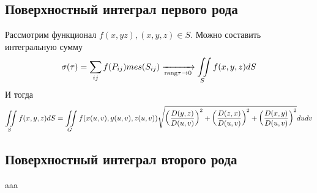 \subsection{Поверхностный интеграл первого рода}

Рассмотрим функционал $f(x, y z), (x, y, z) \in S$.
Можно составить интегральную сумму 
\begin{gather*}
	\sigma(\tau) = \sum\limits_{ij} f(P_{ij}) mes(S_{ij})
	\xrightarrow[\text{rang}\tau \rightarrow 0]{} \iint\limits_{S}f(x, y, z)dS
\end{gather*}
И тогда
\begin{gather*}
	\iint\limits_{S}f(x,y,z)dS = \iint\limits_{G}f(x(u,v), y(u,v), z(u, v))
	\sqrt{\left( \frac{D(y,z)}{D(u,v)} \right)^2 + 
	\left( \frac{D(z, x)}{D(u,v)} \right)^2 +
	\left( \frac{D(x, y)}{D(u,v)}\right)^2} dudv
\end{gather*}

\subsection{Поверхностный интеграл второго рода}
aaa
